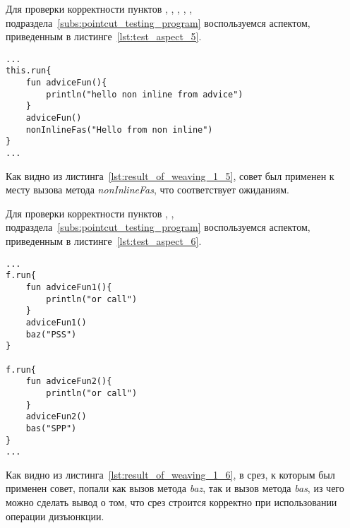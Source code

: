 Для проверки корректности пунктов \quotes{\ref{list:method_name_check}},
\quotes{\ref{list:class_name_check}},
\quotes{\ref{list:method_params_check}},
\quotes{\ref{list:method_modifiers_check}},
\quotes{\ref{list:method_inline_check}},
\quotes{\ref{list:logic_operations_check}} подраздела~\ref{subs:pointcut_testing_program} воспользуемся аспектом, приведенным в листинге~\ref{lst:test_aspect_5}.
\begin{lstlisting}[style={java}, label={lst:result_of_weaving_1_5},
 caption={Результат применения аспекта, описанного в листинге~\ref{lst:test_aspect_5}, к тестовой программе}]
...
this.run{
	fun adviceFun(){
        println("hello non inline from advice")
    }
	adviceFun()
	nonInlineFas("Hello from non inline")
}
...
\end{lstlisting}
Как видно из листинга~\ref{lst:result_of_weaving_1_5}, совет был применен к месту вызова метода \textit{nonInlineFas}, что соответствует ожиданиям.

 Для проверки корректности пунктов
 \quotes{\ref{list:method_name_check}},
 \quotes{\ref{list:class_name_check}},
 \quotes{\ref{list:logic_operations_check}} подраздела~\ref{subs:pointcut_testing_program} воспользуемся аспектом, приведенным в листинге~\ref{lst:test_aspect_6}.
 \begin{lstlisting}[style={java}, label={lst:result_of_weaving_1_6},
 caption={Результат применения аспекта, описанного в листинге~\ref{lst:test_aspect_6}, к тестовой программе}]
...
f.run{
	fun adviceFun1(){
        println("or call")
    }
	adviceFun1()
	baz("PSS")
}

f.run{
	fun adviceFun2(){
        println("or call")
    }
	adviceFun2()
	bas("SPP")
}
...
\end{lstlisting}
Как видно из листинга~\ref{lst:result_of_weaving_1_6}, в срез, к которым был применен совет, попали как вызов метода \textit{baz}, так и вызов метода \textit{bas}, из чего можно сделать вывод о том, что срез строится корректно при использовании операции дизъюнкции.
